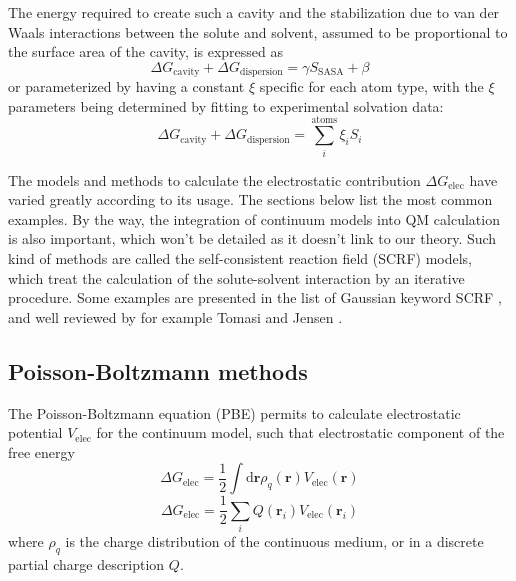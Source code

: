 The energy required to create such a cavity and the stabilization
due to van der Waals interactions between the solute and solvent,
assumed to be proportional to the surface area of the cavity, is expressed
as
\begin{equation}
\Delta G_{\mathrm{cavity}}+\Delta G_{\mathrm{dispersion}}=\gamma S_{\mathrm{SASA}}+\beta
\end{equation}
or parameterized by having a constant $\xi$ specific for each atom
type, with the $\xi$ parameters being determined by fitting to experimental
solvation data:
\begin{equation}
\Delta G_{\mathrm{cavity}}+\Delta G_{\mathrm{dispersion}}=\sum_{i}^{\mathrm{atoms}}\xi_{i}S_{i}
\end{equation}


The models and methods to calculate the electrostatic contribution
$\Delta G_{\mathrm{elec}}$ have varied greatly according to its usage.
The sections below list the most common examples. By the way, the
integration of continuum models into \acs{QM} calculation is also
important, which won't be detailed as it doesn't link to our theory.
Such kind of methods are called the self-consistent reaction field
(SCRF) models, which treat the calculation of the solute-solvent interaction
by an iterative procedure. Some examples are presented in the list
of Gaussian keyword SCRF \citep{scrf}, and well reviewed by for example
Tomasi \citep{Tomasi_1994_implicit_model,tomasi_quantum_2005} and
Jensen \citep{Jensen}.


\subsection{Poisson-Boltzmann methods\label{sub:Poisson=002013Boltzmann-methods}}

The Poisson-Boltzmann equation (PBE) \citep{holst_1994_poisson} permits
to calculate electrostatic potential $V_{\mathrm{elec}}$ for the
continuum model, such that electrostatic component of the free energy
\begin{equation}
\Delta G_{\mathrm{elec}}=\frac{1}{2}\int\mathrm{d}\mathbf{r}\rho_{q}(\mathbf{r})V_{\mathrm{elec}}(\mathbf{r})
\end{equation}
\begin{equation}
\Delta G_{\mathrm{elec}}=\frac{1}{2}\sum_{i}Q(\mathbf{r}_{i})V_{\mathrm{elec}}(\mathbf{r}_{i})
\end{equation}
where $\rho_{q}$ is the charge distribution of the continuous medium,
or in a discrete partial charge description $Q$.


